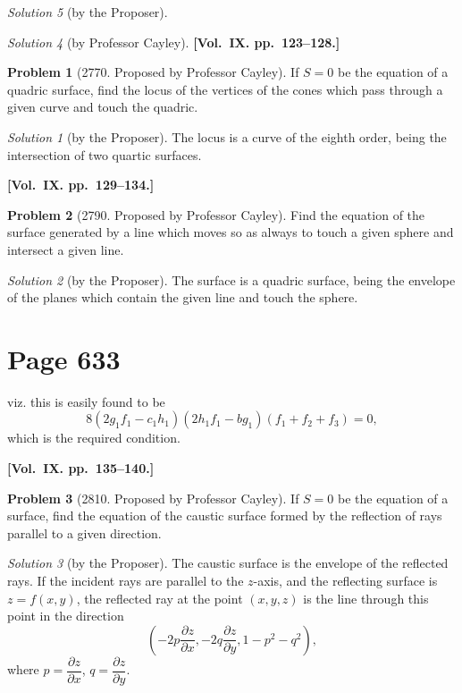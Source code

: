 \documentclass[12pt,a4paper]{article}
\theoremstyle{plain}
\theoremstyle{definition}
\newtheorem{problem}{Problem}
\theoremstyle{remark}
\newtheorem*{solution}{Solution}
\begin{document}
\begin{solution}[by the Proposer]
\begin{solution}[by Professor Cayley]
\medskip\noindent\textbf{[Vol.~IX. pp.~123--128.]}

\begin{problem}[2770. Proposed by Professor Cayley]
If $S = 0$ be the equation of a quadric surface, find the locus of the vertices of the cones which pass through a given curve and touch the quadric.
\end{problem}

\begin{solution}[by the Proposer]
The locus is a curve of the eighth order, being the intersection of two quartic surfaces.
\end{solution}

\medskip\noindent\textbf{[Vol.~IX. pp.~129--134.]}

\begin{problem}[2790. Proposed by Professor Cayley]
Find the equation of the surface generated by a line which moves so as always to touch a given sphere and intersect a given line.
\end{problem}

\begin{solution}[by the Proposer]
The surface is a quadric surface, being the envelope of the planes which contain the given line and touch the sphere.
\end{solution}

\section*{Page 633}
\setcounter{page}{633}

viz. this is easily found to be
\[
8(2g_1f_1 - c_1h_1)(2h_1f_1 - bg_1)(f_1 + f_2 + f_3) = 0,
\]
which is the required condition.

\medskip\noindent\textbf{[Vol.~IX. pp.~135--140.]}

\begin{problem}[2810. Proposed by Professor Cayley]
If $S = 0$ be the equation of a surface, find the equation of the caustic surface formed by the reflection of rays parallel to a given direction.
\end{problem}

\begin{solution}[by the Proposer]
The caustic surface is the envelope of the reflected rays. If the incident rays are parallel to the $z$-axis, and the reflecting surface is $z = f(x, y)$, the reflected ray at the point $(x, y, z)$ is the line through this point in the direction
\[
\left(-2p\frac{\partial z}{\partial x}, -2q\frac{\partial z}{\partial y}, 1 - p^2 - q^2\right),
\]
where $p = \dfrac{\partial z}{\partial x}$, $q = \dfrac{\partial z}{\partial y}$.
\end{solution}


\end{solution}
\end{solution}
\end{document}
